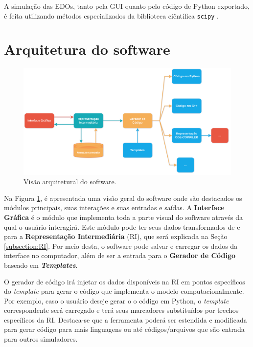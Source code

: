 \documentclass[
	12pt,				%
	openright,			%
	oneside,			%
	a4paper,			%
	main=brazil,
	english,			%
	]{ufsj-abntex2}
\begin{document}
A simulação das EDOs, tanto pela GUI quanto pelo código de Python exportado, é feita utilizando métodos especializados da biblioteca ciêntífica \texttt{scipy} \cite{scipy}. %

\section{Arquitetura do software}

\begin{figure}[h]
    \centering
    \includegraphics[scale=0.125]{imgs/passos_divisao_software.png} 
    \caption{Visão arquitetural do software.}
    \label{fig::arquitetura_software}
\end{figure}

Na Figura \ref{fig::arquitetura_software}, é apresentada uma visão geral do software onde são destacados os módulos principais, suas interações e suas entradas e saídas. A \textbf{Interface Gráfica} é o módulo que implementa toda a parte visual do software através da qual o usuário interagirá. Este módulo pode ter seus dados transformados de e para a \textbf{Representação Intermediária} (RI), que será explicada na Seção \ref{subsection:RI}. Por meio desta, o software pode salvar e carregar os dados da interface no computador, além de ser a entrada para o \textbf{Gerador de Código} baseado em \textbf{\textit{Templates}}.

O gerador de código irá injetar os dados disponíveis na RI em pontos específicos do \textit{template} para gerar o código que implementa o modelo computacionalmente. Por exemplo, caso o usuário deseje gerar o o código em Python, o \textit{template} correspondente será carregado e terá seus marcadores substituídos por trechos específicos da RI. Destaca-se que a ferramenta poderá ser estendida e modificada para gerar código para mais linguagens ou até códigos/arquivos que são entrada para outros simuladores. 
\end{document}
